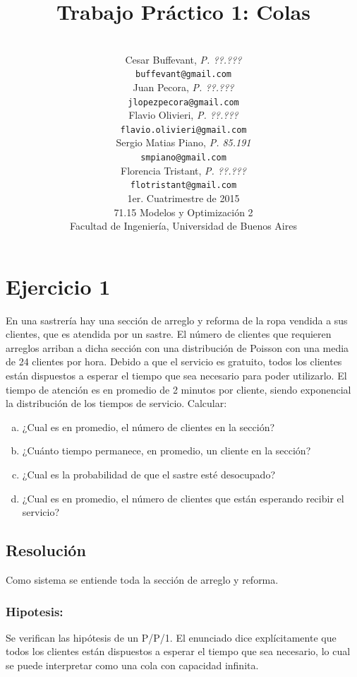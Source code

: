 \documentclass[a4paper,11pt]{article}
\title{\textbf{Trabajo Práctico 1: Colas}}
\author{\\
  Cesar Buffevant, \textit{P. ??.???}                              \\
  \texttt{buffevant@gmail.com}                                     \\ [2.5ex]
  Juan Pecora, \textit{P. ??.???}                                  \\
  \texttt{jlopezpecora@gmail.com}                                  \\ [2.5ex]
  Flavio Olivieri, \textit{P. ??.???}                              \\
  \texttt{flavio.olivieri@gmail.com}                               \\ [2.5ex]
  Sergio Matias Piano, \textit{P. 85.191}                          \\
  \texttt{smpiano@gmail.com}                                       \\ [2.5ex]
  Florencia Tristant, \textit{P. ??.???}                           \\
  \texttt{flotristant@gmail.com}                                   \\ [2.5ex]
  \normalsize{1er. Cuatrimestre de 2015}                           \\
  \normalsize{71.15 Modelos y Optimización 2}                      \\
  \normalsize{Facultad de Ingeniería, Universidad de Buenos Aires} \\
}
\date{}
\begin{document}
\thispagestyle{empty}
\maketitle

\clearpage

\section*{\textbf{Ejercicio 1}}

\baselineskip=13pt
En una sastrería hay una sección de arreglo y reforma de la ropa vendida a sus
clientes, que es atendida por un sastre. El número de clientes que requieren
arreglos arriban a dicha sección con una distribución de Poisson con una media
de 24 clientes por hora. Debido a que el servicio es gratuito, todos los
clientes están dispuestos a esperar el tiempo que sea necesario para poder
utilizarlo. El tiempo de atención es en promedio de 2 minutos por cliente,
siendo exponencial la distribución de los tiempos de servicio. Calcular:

\leftskip=36pt
\parindent=-18pt
\begin{enumerate}[a)]
  \item ¿Cual es en promedio, el número de clientes en la sección?

  \item ¿Cuánto tiempo permanece, en promedio, un cliente en la sección?

  \item ¿Cual es la probabilidad de que el sastre esté desocupado?

  \item ¿Cual es en promedio, el número de clientes que están esperando recibir
    el servicio?
\end{enumerate}

\vspace{13pt}
\leftskip=0pt
\parindent=0pt
\subsection*{\textbf{Resolución}}

Como sistema se entiende toda la sección de arreglo y
reforma.

\vspace{5pt}
\subsubsection*{Hipotesis:}

Se verifican las hipótesis de un P/P/1. El enunciado dice explícitamente que
todos los clientes están dispuestos a esperar el tiempo que sea necesario, lo
cual se puede interpretar como una cola con capacidad infinita.
\end{document}
